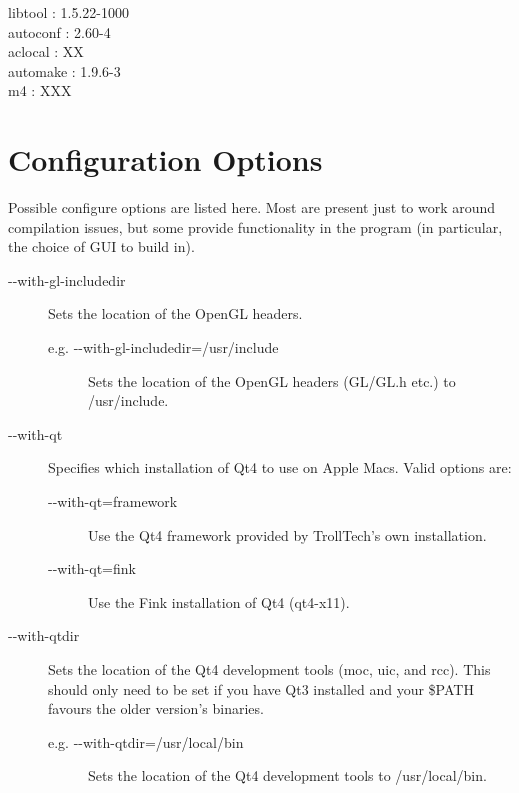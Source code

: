 {\sffamily
\indent libtool  :  1.5.22-1000\\
\indent autoconf :  2.60-4\\
\indent aclocal  :  XX\\
\indent automake :  1.9.6-3\\
\indent m4       :  XXX\\
}

\section{Configuration Options}

Possible {\sffamily configure} options are listed here. Most are present just to work around compilation issues, but some provide functionality in the program (in particular, the choice of GUI to build in).

\begin{description}

	\item[{-}{-}with-gl-includedir]
		Sets the location of the OpenGL headers.
	\begin{description}
		\item[e.g. {-}{-}with-gl-includedir=/usr/include]
			Sets the location of the OpenGL headers (GL/GL.h etc.) to /usr/include.
	\end{description}

	\item[{-}{-}with-qt] Specifies which installation of Qt4 to use on Apple Macs. Valid options are:
	\begin{description}
		\item[{-}{-}with-qt=framework]
			Use the Qt4 framework provided by TrollTech's own installation.
		\item[{-}{-}with-qt=fink]
			Use the Fink installation of Qt4 (qt4-x11).
	\end{description}

	\item[{-}{-}with-qtdir] Sets the location of the Qt4 development tools ({\sffamily moc}, {\sffamily uic}, and {\sffamily rcc}). This should only need to be set if you have Qt3 installed and your \$PATH favours the older version's binaries.
	\begin{description}
		\item[e.g. {-}{-}with-qtdir=/usr/local/bin]
			Sets the location of the Qt4 development tools to /usr/local/bin.
	\end{description}

\end{description}


